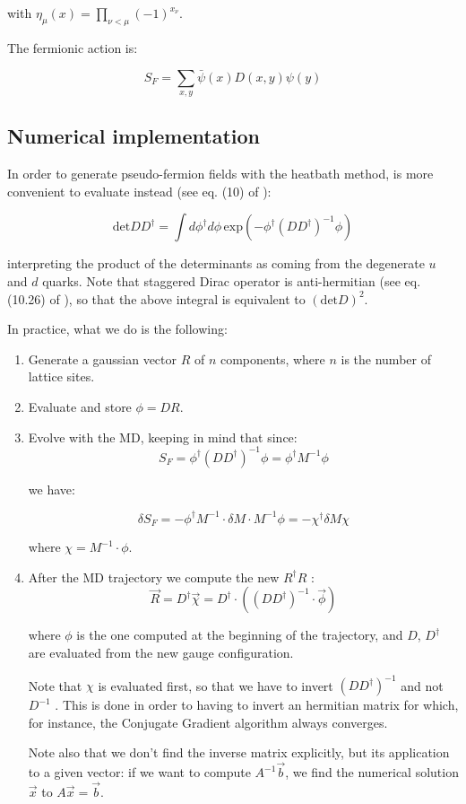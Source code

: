 \documentclass[12pt, a4paper]{article}
\begin{document}
with $\eta_{\mu}(x) = \prod_{\nu<\mu} (-1)^{x_{\nu}}$.

The fermionic action is:

\begin{equation}
S_F = \sum_{x, y} \bar{\psi}(x) D(x,y) \psi(y)
\end{equation}

\subsection{Numerical implementation}

In order to generate pseudo-fermion fields with the heatbath method, is more convenient to evaluate instead (see eq. (10) of \cite{BITAR1989377}):

$$
\text{det} D D^{\dagger} = 
\int d \phi^{\dagger} d \phi 
\, \text{exp}(-\phi^{\dagger} (D D^{\dagger})^{-1} \phi)
$$

interpreting the product of the determinants as coming from the degenerate $u$ and $d$ quarks. 
Note that staggered Dirac operator is anti-hermitian 
(see eq. (10.26) of \cite{gattringer2009quantum}), 
so that the above integral is equivalent to $( \text{det} D)^2$.

In practice, what we do is the following:

\begin{enumerate}
    \item
    Generate a gaussian vector $R$ of $n$ components, where 
    $n$ is the number of lattice sites.
    \item
    Evaluate and store $\phi = D R$.
    \item
    Evolve with the MD, keeping in mind that since:
    $$
    S_F = 
    \phi^{\dagger} (D D^{\dagger})^{-1} \phi = 
    \phi^{\dagger} M^{-1} \phi
    $$
    
    we have:
    
    \begin{equation} \label{eq:dSF.generic}
    \delta S_F 
    = - \phi^{\dagger} M^{-1} \cdot \delta M \cdot M^{-1} \phi 
    = - \chi^{\dagger} \delta M \chi
    \end{equation}

    
    where $\chi = M^{-1} \cdot \phi$.
    \item
    After the MD trajectory we compute the new $R^{\dagger} R$ :
    $$
    \vec{R} = D^{\dagger} \vec{\chi} 
    = D^{\dagger} \cdot ( (D D^{\dagger})^{-1} \cdot \vec{\phi})
    $$
    
    where $\phi$ is the one computed at the beginning of the trajectory, 
    and $D$, $D^{\dagger}$ are evaluated from the new gauge configuration. 
    
    Note that $\chi$ is evaluated first, 
    so that we have to invert $(D D^{\dagger})^{-1}$ and not $D^{-1}$ . 
    This is done in order to having to invert an hermitian matrix for which, for instance, 
    the Conjugate Gradient algorithm always converges.
    
    Note also that we don't find the inverse matrix explicitly, 
    but its application to a given vector: 
    if we want to compute $A^{-1} \vec{b}$, 
    we find the numerical solution $\vec{x}$ to $A \vec{x} = \vec{b}$.
\end{enumerate}
\end{document}
